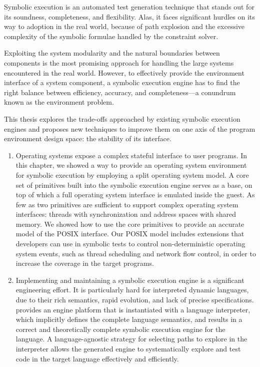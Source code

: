 Symbolic execution is an automated test generation technique that stands out for its soundness, completeness, and flexibility.
%
Alas, it faces significant hurdles on its way to adoption in the real world, because of path explosion and the excessive complexity of the symbolic formulae handled by the constraint solver.

Exploiting the system modularity and the natural boundaries between components is the most promising approach for handling the large systems encountered in the real world.
%
However, to effectively provide the environment interface of a system component, a symbolic execution engine has to find the right balance between efficiency, accuracy, and completeness---a conundrum known as the environment problem.

This thesis explores the trade-offs approached by existing symbolic execution engines and proposes new techniques to improve them on one axis of the program environment design space: the stability of its interface.

\begin{enumerate}
\item Operating systems expose a complex stateful interface to user programs.
%
In this chapter, we showed a way to provide an operating system environment for symbolic execution by employing a split operating system model.  A core set of primitives built into the symbolic execution engine serves as a base, on top of which a full operating system interface is emulated inside the guest.
%
As few as two primitives are sufficient to support complex operating system interfaces: threads  with synchronization and address spaces with shared memory.
%
We showed how to use the core primitives to provide an accurate model of the POSIX interface.
%
Our POSIX model includes extensions that developers can use in symbolic tests to control non-deterministic operating system events, such as thread scheduling and network flow control, in order to increase the coverage in the target programs.

\item Implementing and maintaining a symbolic execution engine is a significant engineering effort. It is particularly hard for interpreted dynamic languages, due to their rich semantics, rapid evolution, and lack of precise specifications.
%
\chef provides an engine platform that is instantiated with a language interpreter, which implicitly defines the complete language semantics, and results in a correct and theoretically complete symbolic execution engine for the language.
%
A language-agnostic strategy for selecting paths to explore in the interpreter allows the generated engine to systematically explore and test code in the target language effectively and efficiently.
\end{enumerate}


